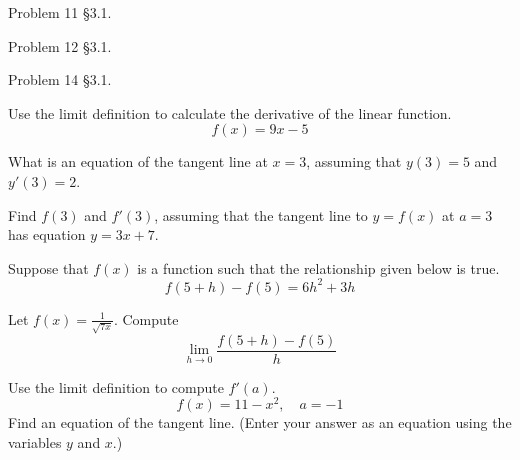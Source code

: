 \documentclass[12pt,addpoints, answers, fleqn]{exam}
\begin{document}
\begin{teacher}
\begin{questions}
Problem 11 \S3.1.

\question 	%

Problem 12 \S3.1.

\question 	%

Problem 14 \S3.1.

\question 	%

Use the limit definition to calculate the derivative of the linear function.
\[
f\left(x\right) = 9x - 5
\]

\question 	%

What is an equation of the tangent line at $x = 3$, assuming that $y\left(3\right) = 5$ and $y'\left(3\right) = 2$.




\question 	%


Find $f\left( 3 \right)$ and $f'\left(3\right)$, assuming that the tangent line to $y = f\left(x\right)$ at $a = 3$ has equation $y = 3x + 7$.

\question 	%


Suppose that $f\left (x\right)$ is a function such that the relationship given below is true.
\[
f \left(5 + h\right) - f \left(5\right) = 6h^2 + 3h 
\]


\question 	%

Let $f\left(x\right) = \displaystyle \frac{1}{\sqrt{7x}}$. Compute
\[
\lim_{h \to 0} \frac{f\left(5 + h\right) - f\left(5\right)}{h} 
\]


\question 	%

Use the limit definition to compute $f'\left(a\right)$.
\[
f\left(x\right) = 11 - x^2, \quad a = -1
\]
Find an equation of the tangent line. (Enter your answer as an equation using the variables $y$ and $x$.)



\end{questions}
\end{teacher}
\end{document}

